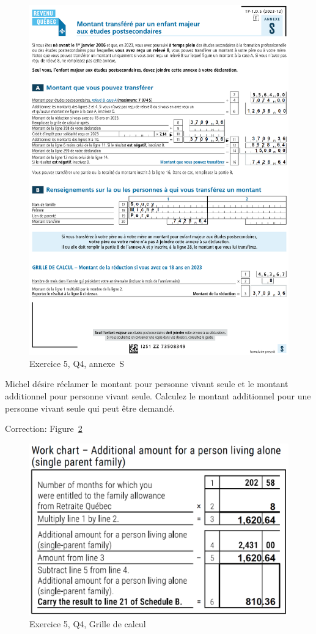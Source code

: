 \begin{figure}
	\centering
	\includegraphics[width=.9\textwidth]{exercice/4-5/Q4/Annexe-S.png}
	\caption[]{Exercice 5, Q4, annexe~S}
	\label{fig:chap4Exercice5Q4AnnexeS}
\end{figure}

\begin{sousQuestion}
	Michel désire réclamer le montant pour personne vivant seule et le montant additionnel pour personne vivant seule. Calculez le montant additionnel pour une personne vivant seule qui peut être demandé.
	
\end{sousQuestion}
Correction: Figure~\ref{fig:chap4Exercice5Q4GrilleCalcul}
\begin{figure}
	\centering
	\includegraphics[width=.5\textwidth]{exercice/4-5/Q4/GrilleCalcul.png}
	\caption[]{Exercice 5, Q4, Grille de calcul}
	\label{fig:chap4Exercice5Q4GrilleCalcul}
\end{figure}


